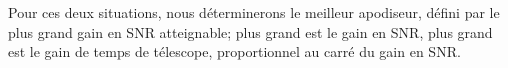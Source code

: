 




Pour ces deux situations, nous déterminerons le meilleur apodiseur, défini par le plus grand gain en SNR atteignable; plus grand est le gain en SNR, plus grand est le gain de temps de télescope, proportionnel au carré du gain en SNR.


